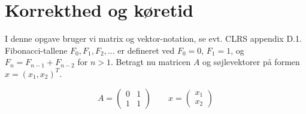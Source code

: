 \documentclass{article}
\theoremstyle{definition}
\begin{document}
\section{Korrekthed og køretid}
I denne opgave bruger vi matrix og vektor-notation, se evt. CLRS appendix D.1. Fibonacci-tallene $F_0, F_1, F_2,\ldots$ er defineret ved $F_0 = 0$, $F_1 = 1$, og $F_n = F_{n-1} + F_{n-2}$ for $n > 1$. Betragt nu matricen $A$ og søjlevektorer på formen $x = (x_1, x_2)^T$.

\[
A = \begin{pmatrix} 0 & 1 \\ 1 & 1 \end{pmatrix} \qquad
x = \begin{pmatrix} x_1 \\ x_2 \end{pmatrix}
\]
\end{document}
